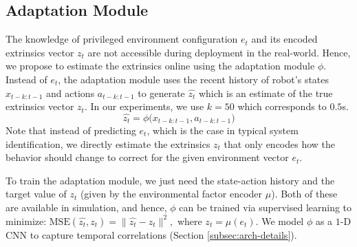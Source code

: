 \documentclass[conference]{IEEEtran}
\newcommand{\aravind}[1]{{\color{blue} {Aravind: {#1}}}}
\begin{document}
\subsection{Adaptation Module}
The knowledge of privileged environment configuration $e_t$ and its encoded extrinsics vector $z_t$ are not accessible during deployment in the real-world. Hence, we propose to estimate the extrinsics online using the adaptation module $\phi$.
Instead of $e_t$, the adaptation module uses the recent history of robot's states $x_{t-k:t-1}$ and actions $a_{t-k:t-1}$ to generate $\hat{z_t}$ which is an estimate of the true extrinsics vector $z_t$. In our experiments, we use $k = 50$ which corresponds to $0.5$s. 
$$\hat{z_t} =  \phi\big(x_{t-k:t-1}, a_{t-k:t-1}\big)$$
Note that instead of predicting $e_t$, which is the case in typical system identification, we directly estimate the extrinsics $z_t$ that only encodes how the behavior should change to correct for the given environment vector $e_t$.

To train the adaptation module, we just need the state-action history and the target value of $z_t$ (given by the environmental factor encoder  $\mu$). Both of these are available in simulation, and hence, $\phi$ can be trained via supervised learning to minimize: $\text{MSE}(\hat{z_t}, z_t) = \| \hat{z_t} - z_t\|^2,$
where $z_t = \mu(e_t)$. We model $\phi$ as a $1$-D CNN to capture temporal correlations (Section \ref{subsec:arch-details}). 
\end{document}
